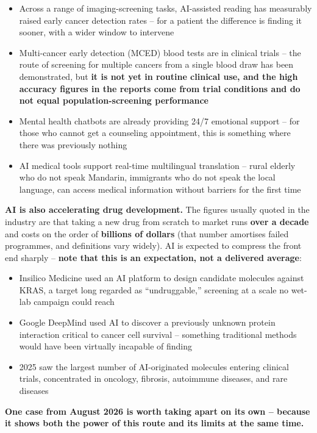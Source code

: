 \documentclass[11pt,a4paper]{article}
\begin{document}
\begin{itemize}
  \item Across a range of imaging-screening tasks, AI-assisted reading has measurably raised early cancer detection rates -- for a patient the difference is finding it sooner, with a wider window to intervene
  \item Multi-cancer early detection (MCED) blood tests are in clinical trials -- the route of screening for multiple cancers from a single blood draw has been demonstrated, but \textbf{it is not yet in routine clinical use, and the high accuracy figures in the reports come from trial conditions and do not equal population-screening performance}
  \item Mental health chatbots are already providing 24/7 emotional support -- for those who cannot get a counseling appointment, this is something where there was previously nothing
  \item AI medical tools support real-time multilingual translation -- rural elderly who do not speak Mandarin, immigrants who do not speak the local language, can access medical information without barriers for the first time
\end{itemize}

\textbf{AI is also accelerating drug development.} The figures usually quoted in the industry are that taking a new drug from scratch to market runs \textbf{over a decade} and costs on the order of \textbf{billions of dollars} (that number amortises failed programmes, and definitions vary widely). AI is expected to compress the front end sharply -- \textbf{note that this is an expectation, not a delivered average}:

\begin{itemize}
  \item Insilico Medicine used an AI platform to design candidate molecules against KRAS, a target long regarded as ``undruggable,'' screening at a scale no wet-lab campaign could reach
  \item Google DeepMind used AI to discover a previously unknown protein interaction critical to cancer cell survival -- something traditional methods would have been virtually incapable of finding
  \item 2025 saw the largest number of AI-originated molecules entering clinical trials, concentrated in oncology, fibrosis, autoimmune diseases, and rare diseases
\end{itemize}

\textbf{One case from August 2026 is worth taking apart on its own -- because it shows both the power of this route and its limits at the same time.}
\end{document}
